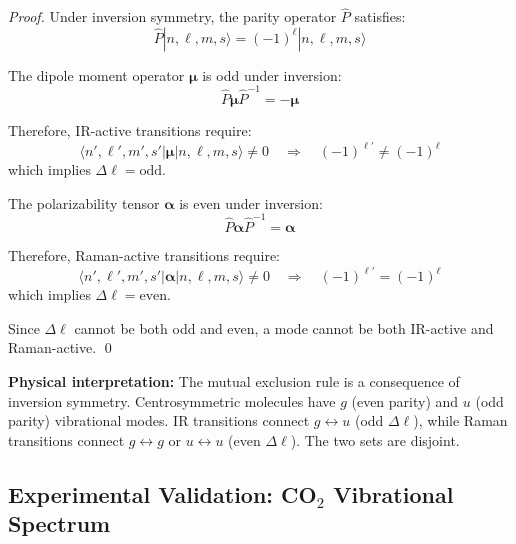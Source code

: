 \documentclass[twocolumn,10pt]{article}
\theoremstyle{remark}
\begin{document}
\begin{proof}
Under inversion symmetry, the parity operator $\hat{P}$ satisfies:
\begin{equation}
    \hat{P} |n, \ell, m, s\rangle = (-1)^\ell |n, \ell, m, s\rangle
    \label{eq:parity_eigenvalue}
\end{equation}

The dipole moment operator $\boldsymbol{\mu}$ is odd under inversion:
\begin{equation}
    \hat{P} \boldsymbol{\mu} \hat{P}^{-1} = -\boldsymbol{\mu}
    \label{eq:dipole_parity}
\end{equation}

Therefore, IR-active transitions require:
\begin{equation}
    \langle n', \ell', m', s' | \boldsymbol{\mu} | n, \ell, m, s \rangle \neq 0 \quad \Rightarrow \quad (-1)^{\ell'} \neq (-1)^{\ell}
    \label{eq:IR_parity_condition}
\end{equation}
which implies $\Delta \ell = \text{odd}$.

The polarizability tensor $\boldsymbol{\alpha}$ is even under inversion:
\begin{equation}
    \hat{P} \boldsymbol{\alpha} \hat{P}^{-1} = \boldsymbol{\alpha}
    \label{eq:polarizability_parity}
\end{equation}

Therefore, Raman-active transitions require:
\begin{equation}
    \langle n', \ell', m', s' | \boldsymbol{\alpha} | n, \ell, m, s \rangle \neq 0 \quad \Rightarrow \quad (-1)^{\ell'} = (-1)^{\ell}
    \label{eq:Raman_parity_condition}
\end{equation}
which implies $\Delta \ell = \text{even}$.

Since $\Delta \ell$ cannot be both odd and even, a mode cannot be both IR-active and Raman-active. \qed
\end{proof}

\textbf{Physical interpretation:} The mutual exclusion rule is a consequence of inversion symmetry. Centrosymmetric molecules have $g$ (even parity) and $u$ (odd parity) vibrational modes. IR transitions connect $g \leftrightarrow u$ (odd $\Delta \ell$), while Raman transitions connect $g \leftrightarrow g$ or $u \leftrightarrow u$ (even $\Delta \ell$). The two sets are disjoint.

\subsection{Experimental Validation: CO$_2$ Vibrational Spectrum}
\end{document}
